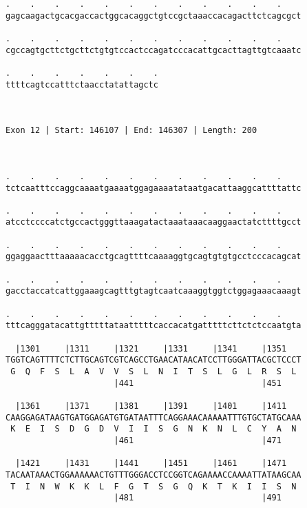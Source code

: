 \documentclass{article}
\begin{document}
\begin{Verbatim}
.    .    .    .    .    .    .    .    .    .    .    .    
gagcaagactgcacgaccactggcacaggctgtccgctaaaccacagacttctcagcgct
                                                            
.    .    .    .    .    .    .    .    .    .    .    .    
cgccagtgcttctgcttctgtgtccactccagatcccacattgcacttagttgtcaaatc
                                                            
.    .    .    .    .    .    .
ttttcagtccatttctaacctatattagctc
                               
                               
 
Exon 12 | Start: 146107 | End: 146307 | Length: 200



.    .    .    .    .    .    .    .    .    .    .    .    
tctcaatttccaggcaaaatgaaaatggagaaaatataatgacattaaggcattttattc
                                                            
.    .    .    .    .    .    .    .    .    .    .    .    
atcctccccatctgccactgggttaaagatactaaataaacaaggaactatcttttgcct
                                                            
.    .    .    .    .    .    .    .    .    .    .    .    
ggaggaactttaaaaacacctgcagttttcaaaaggtgcagtgtgtgcctcccacagcat
                                                            
.    .    .    .    .    .    .    .    .    .    .    .    
gacctaccatcattggaaagcagtttgtagtcaatcaaaggtggtctggagaaacaaagt
                                                            
.    .    .    .    .    .    .    .    .    .    .    .    
tttcagggatacattgtttttataatttttcaccacatgatttttcttctctccaatgta
                                                            
  |1301     |1311     |1321     |1331     |1341     |1351   
TGGTCAGTTTTCTCTTGCAGTCGTCAGCCTGAACATAACATCCTTGGGATTACGCTCCCT
 G  Q  F  S  L  A  V  V  S  L  N  I  T  S  L  G  L  R  S  L 
                      |441                          |451    
  
  |1361     |1371     |1381     |1391     |1401     |1411   
CAAGGAGATAAGTGATGGAGATGTGATAATTTCAGGAAACAAAAATTTGTGCTATGCAAA
 K  E  I  S  D  G  D  V  I  I  S  G  N  K  N  L  C  Y  A  N 
                      |461                          |471    
  
  |1421     |1431     |1441     |1451     |1461     |1471   
TACAATAAACTGGAAAAAACTGTTTGGGACCTCCGGTCAGAAAACCAAAATTATAAGCAA
 T  I  N  W  K  K  L  F  G  T  S  G  Q  K  T  K  I  I  S  N 
                      |481                          |491    
  

\end{Verbatim}
\end{document}
